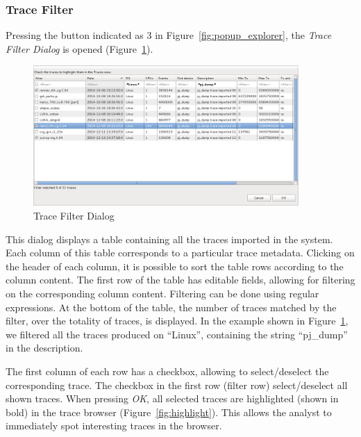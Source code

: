 \documentclass[twoside]{article}
\begin{document}
\begin{sloppypar}
\subsubsection{Trace Filter}
\label{subsubsec:trace_filter}

Pressing the button indicated as \num{3} in Figure~\ref{fig:popup_explorer}, the \emph{Trace Filter Dialog} is opened (Figure~\ref{fig:trace_filter_dialog}).

\begin{figure}[h!]
  \centering
    \includegraphics[width=0.9\textwidth]{images/trace_table_filter.png}
  \caption{Trace Filter Dialog}
  \label{fig:trace_filter_dialog}
\end{figure}

This dialog displays a table containing all the traces imported in the system. Each column of this table corresponds to a particular trace metadata. Clicking on the header of each column, it is possible to sort the table rows according to the column content. The first row of the table has editable fields, allowing for filtering on the corresponding column content. Filtering can be done using regular expressions. At the bottom of the table, the number of traces matched by the filter, over the totality of traces, is displayed. In the example shown in Figure~\ref{fig:trace_filter_dialog}, we filtered all the traces produced on ``Linux'', containing the string ``pj\_dump'' in the description.

The first column of each row has a checkbox, allowing to select/deselect the corresponding trace. The checkbox in the first row (filter row) select/deselect all shown traces.
When pressing \emph{OK}, all selected traces are highlighted (shown in bold) in the trace browser (Figure~\ref{fig:highlight}). This allows the analyst to immediately spot interesting traces in the browser.


\end{sloppypar}
\end{document}
